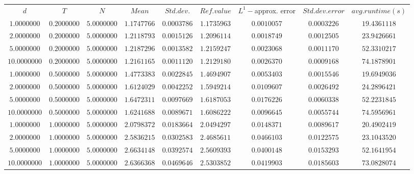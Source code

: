 \begin{tabular}{ccccccccc}
$d$ & $T$ & $N$ & $Mean$ & $Std. dev.$ & $Ref. value$ & $L^1-$approx. error & $Std. dev. error$ & $avg. runtime (s)$\\
$1.0000000$ & $0.2000000$ & $5.0000000$ & $1.1747766$ & $0.0003786$ & $1.1735963$ & $0.0010057$ & $0.0003226$ & $19.4361118$\\
$2.0000000$ & $0.2000000$ & $5.0000000$ & $1.2118793$ & $0.0015126$ & $1.2096114$ & $0.0018749$ & $0.0012505$ & $23.9426661$\\
$5.0000000$ & $0.2000000$ & $5.0000000$ & $1.2187296$ & $0.0013582$ & $1.2159247$ & $0.0023068$ & $0.0011170$ & $52.3310217$\\
$10.0000000$ & $0.2000000$ & $5.0000000$ & $1.2161165$ & $0.0011120$ & $1.2129180$ & $0.0026370$ & $0.0009168$ & $74.1878901$\\
$1.0000000$ & $0.5000000$ & $5.0000000$ & $1.4773383$ & $0.0022845$ & $1.4694907$ & $0.0053403$ & $0.0015546$ & $19.6949036$\\
$2.0000000$ & $0.5000000$ & $5.0000000$ & $1.6124029$ & $0.0042252$ & $1.5949214$ & $0.0109607$ & $0.0026492$ & $24.2896421$\\
$5.0000000$ & $0.5000000$ & $5.0000000$ & $1.6472311$ & $0.0097669$ & $1.6187053$ & $0.0176226$ & $0.0060338$ & $52.2231845$\\
$10.0000000$ & $0.5000000$ & $5.0000000$ & $1.6241688$ & $0.0089671$ & $1.6086222$ & $0.0096645$ & $0.0055744$ & $74.5956961$\\
$1.0000000$ & $1.0000000$ & $5.0000000$ & $2.0798372$ & $0.0183664$ & $2.0494297$ & $0.0148371$ & $0.0089617$ & $20.4902419$\\
$2.0000000$ & $1.0000000$ & $5.0000000$ & $2.5836215$ & $0.0302583$ & $2.4685611$ & $0.0466103$ & $0.0122575$ & $23.1043520$\\
$5.0000000$ & $1.0000000$ & $5.0000000$ & $2.6634148$ & $0.0392574$ & $2.5609393$ & $0.0400148$ & $0.0153293$ & $52.1641954$\\
$10.0000000$ & $1.0000000$ & $5.0000000$ & $2.6366368$ & $0.0469646$ & $2.5303852$ & $0.0419903$ & $0.0185603$ & $73.0828074$\\
\end{tabular}

